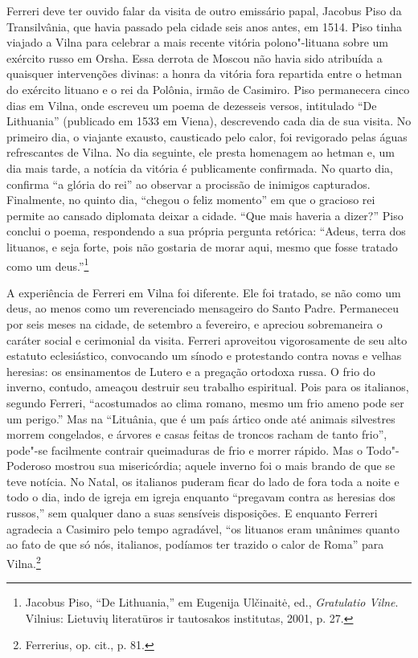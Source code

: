 Ferreri deve ter ouvido falar da visita de outro emissário papal,
Jacobus Piso da Transilvânia, que havia passado pela cidade seis anos
antes, em 1514. Piso tinha viajado a Vilna para celebrar a mais recente
vitória polono"-lituana sobre um exército russo em Orsha. Essa derrota de
Moscou não havia sido atribuída a quaisquer intervenções divinas: a
honra da vitória fora repartida entre o hetman do exército lituano e o
rei da Polônia, irmão de Casimiro. Piso permanecera cinco dias em Vilna,
onde escreveu um poema de dezesseis versos, intitulado ``De Lithuania''
(publicado em 1533 em Viena), descrevendo cada dia de sua visita. No
primeiro dia, o viajante exausto, causticado pelo calor, foi revigorado
pelas águas refrescantes de Vilna. No dia seguinte, ele presta homenagem
ao hetman e, um dia mais tarde, a notícia da vitória é publicamente
confirmada. No quarto dia, confirma ``a glória do rei'' ao observar a
procissão de inimigos capturados. Finalmente, no quinto dia, ``chegou o
feliz momento'' em que o gracioso rei permite ao cansado diplomata
deixar a cidade. ``Que mais haveria a dizer?'' Piso conclui o poema,
respondendo a sua própria pergunta retórica: ``Adeus, terra dos
lituanos, e seja forte, pois não gostaria de morar aqui, mesmo que fosse
tratado como um deus.''\footnote{Jacobus Piso, ``De Lithuania,'' em
  Eugenija Ulčinaitė, ed., \emph{Gratulatio Vilne}. Vilnius: Lietuvių
  literatūros ir tautosakos institutas, 2001, p. 27.}

A experiência de Ferreri em Vilna foi diferente. Ele foi tratado, se não
como um deus, ao menos como um reverenciado mensageiro do Santo Padre.
Permaneceu por seis meses na cidade, de setembro a fevereiro, e apreciou
sobremaneira o caráter social e cerimonial da visita. Ferreri aproveitou
vigorosamente de seu alto estatuto eclesiástico, convocando um sínodo e
protestando contra novas e velhas heresias: os ensinamentos de Lutero e
a pregação ortodoxa russa. O frio do inverno, contudo, ameaçou destruir
seu trabalho espiritual. Pois para os italianos, segundo Ferreri,
``acostumados ao clima romano, mesmo um frio ameno pode ser um perigo.''
Mas na ``Lituânia, que é um país ártico onde até animais silvestres
morrem congelados, e árvores e casas feitas de troncos racham de tanto
frio'', pode"-se facilmente contrair queimaduras de frio e morrer rápido.
Mas o Todo"-Poderoso mostrou sua misericórdia; aquele inverno foi o mais
brando de que se teve notícia. No Natal, os italianos puderam ficar do
lado de fora toda a noite e todo o dia, indo de igreja em igreja
enquanto ``pregavam contra as heresias dos russos,'' sem qualquer dano a
suas sensíveis disposições. E enquanto Ferreri agradecia a Casimiro pelo
tempo agradável, ``os lituanos eram unânimes quanto ao fato de que só
nós, italianos, podíamos ter trazido o calor de Roma'' para
Vilna.\footnote{Ferrerius, op. cit., p. 81.}

